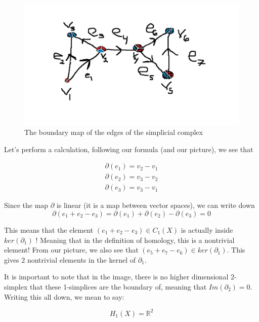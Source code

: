 \documentclass[12pt]{article}
\theoremstyle{plain}
\theoremstyle{definition}
\begin{document}
\begin{figure}[ht]
  \begin{center}
      \includegraphics[scale = .4]{Colored_Cx.jpg}
  \end{center}
\caption{The boundary map of the edges of the simplicial complex}
\end{figure}

Let's perform a calculation, following our formula (and our picture), we see that

\begin{align*}
\partial(e_1) = v_2 - v_1 \\
\partial(e_2) = v_3 - v_2 \\
\partial(e_3) = v_3 - v_1
\end{align*}

Since the map $\partial$ is linear (it is a map between vector spaces), we can write
down 
\begin{equation*}
\partial(e_1 + e_2 - e_3) = \partial(e_1) + \partial(e_2) - \partial(e_3) = 0
\end{equation*}

This means that the element $(e_1 + e_2 - e_3) \in C_1(X)$ is actually inside $ker(\partial_1)$ !
Meaning that in the definition of homology, this is a nontrivial element! From our picture, we also
see that $(e_5 + e_7 - e_6) \in ker(\partial_1)$. This gives 2 nontrivial elements in the kernel of $\partial_1$.

It is important to note that in the image, there is no higher dimensional 2-simplex that these 1-simplices are the
boundary of, meaning that $Im(\partial_2) = 0$. Writing this all down, we mean to say:

\begin{equation*}
  H_1(X) = \mathbb{R}^2
\end{equation*}
\end{document}
